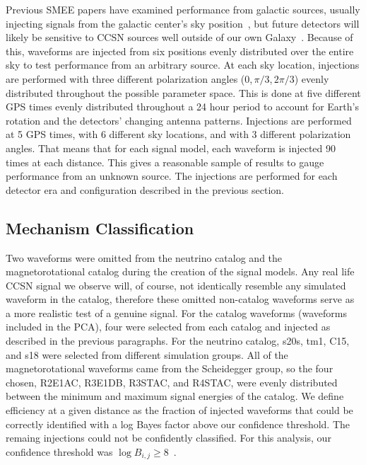 Previous SMEE papers have examined performance from galactic sources, usually injecting signals from the galactic center's sky position~\cite{powell:16b, 2017PhRvD..96l3013P}, but future detectors will likely be sensitive to CCSN sources well outside of our own Galaxy~\cite{0264-9381-27-19-194002, 2017CQGra..34d4001A}. Because of this, waveforms are injected from six positions evenly distributed over the entire sky to test performance from an arbitrary source. At each sky location, injections are performed with three different polarization angles (0,\,$\pi/3$,\,$2\pi/3$) evenly distributed throughout the possible parameter space. This is done at five different GPS times evenly distributed throughout a 24 hour period to account for Earth's rotation and the detectors' changing antenna patterns. Injections are performed at 5 GPS times, with 6 different sky locations, and with 3 different polarization angles. That means that for each signal model, each waveform is injected 90 times at each distance. This gives a reasonable sample of results to gauge performance from an unknown source. The injections are performed for each detector era and configuration described in the previous section.

\subsection{Mechanism Classification}

Two waveforms were omitted from the neutrino catalog and the magnetorotational catalog during the creation of the signal models. Any real life CCSN signal we observe will, of course, not identically resemble any simulated waveform in the catalog, therefore these omitted non-catalog waveforms serve as a more realistic test of a genuine signal. For the catalog waveforms (waveforms included in the PCA), four were selected from each catalog and injected as described in the previous paragraphs. For the neutrino catalog, s20s, tm1, C15, and s18 were selected from different simulation groups. All of the magnetorotational waveforms came from the Scheidegger group, so the four chosen, R2E1AC, R3E1DB, R3STAC, and R4STAC, were evenly distributed between the minimum and maximum signal energies of the catalog. We define efficiency at a given distance as the fraction of injected waveforms that could be correctly identified with a log Bayes factor above our confidence threshold. The remaing injections could not be confidently classified. For this analysis, our confidence threshold was $\log B_{i,j} \geq 8$~\cite{powell:16b, 2017PhRvD..96l3013P}.

